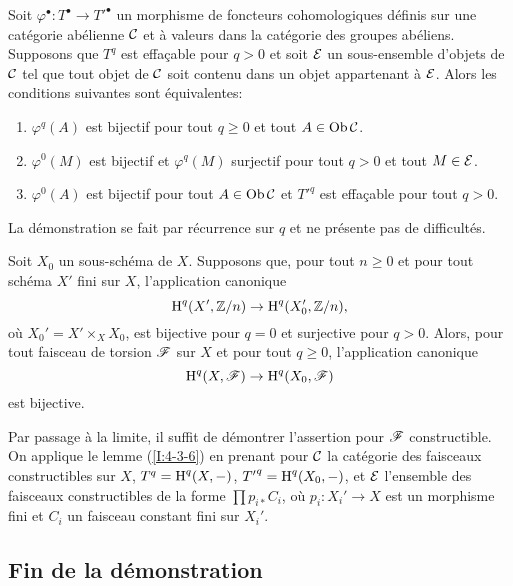 \documentclass[oneside]{book}
\begin{document}
\begin{lemma}\label{I:4-3-6}
Soit $\varphi^\bullet:T^\bullet\to {T'}^\bullet$ un morphisme de foncteurs 
cohomologiques définis sur une catégorie abélienne $\mathcal{C}$ et à valeurs 
dans la catégorie des groupes abéliens. Supposons que $T^q$ est effaçable 
pour $q>0$ et soit $\mathcal{E}$ un sous-ensemble d'objets de $\mathcal{C}$ tel que tout objet 
de $\mathcal{C}$ soit contenu dans un objet appartenant à $\mathcal{E}$. Alors les 
conditions suivantes sont équivalentes:
\begin{enumerate}[\indent (i)]
  \item $\varphi^q(A)$ est bijectif pour tout $q\geqslant 0$ et tout 
    $A\in\operatorname{Ob} \mathcal{C}$.
  \item $\varphi^0(M)$ est bijectif et $\varphi^q(M)$ surjectif pour tout 
    $q>0$ et tout $M\in\mathcal{E}$. 
  \item $\varphi^0(A)$ est bijectif pour tout $A\in\operatorname{Ob} \mathcal{C}$ et ${T'}^q$ est 
    effaçable pour tout $q>0$. 
\end{enumerate}
\end{lemma}

La démonstration se fait par récurrence sur $q$ et ne présente pas de 
difficultés. 





\begin{proposition}\label{I:4-3-7}
Soit $X_0$ un sous-schéma de $X$. Supposons que, pour tout $n\geqslant 0$ et 
pour tout schéma $X'$ fini sur $X$, l'application canonique 
\[
  \operatorname{H}^q(X',\mathbb{Z}/n) \to \operatorname{H}^q(X_0',\mathbb{Z}/n)\text{,}
\]
où $X_0' = X'\times_X X_0$, est bijective pour $q=0$ et surjective pour 
$q>0$. Alors, pour tout faisceau de torsion $\mathscr{F}$ sur $X$ et pour tout 
$q\geqslant 0$, l'application canonique 
\[
  \operatorname{H}^q(X,\mathscr{F}) \to \operatorname{H}^q(X_0,\mathscr{F})
\]
est bijective.
\end{proposition}

Par passage à la limite, il suffit de démontrer l'assertion pour $\mathscr{F}$ 
constructible. On applique le lemme (\ref{I:4-3-6}) en prenant pour $\mathcal{C}$ la 
catégorie des faisceaux constructibles sur $X$, $T^q=\operatorname{H}^q(X,-)$, 
${T'}^q=\operatorname{H}^q(X_0,-)$, et $\mathcal{E}$ l'ensemble des faisceaux constructibles de la 
forme $\prod p_{i*} C_i$, où $p_i:X_i'\to X$ est un morphisme fini et $C_i$ 
un faisceau constant fini sur $X_i'$. 










\subsection{Fin de la démonstration}\label{I:4-4}
\end{document}
